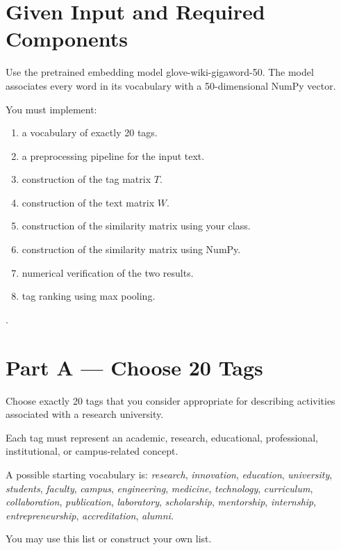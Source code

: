 \documentclass[12pt]{article}
\begin{document}
\section*{Given Input and Required Components}
Use the pretrained embedding model glove-wiki-gigaword-50.
The model associates every word in its vocabulary with a
50-dimensional NumPy vector.

You must implement:
\begin{enumerate}
    \item a vocabulary of exactly 20 tags.
    \item a preprocessing pipeline for the input text.
    \item construction of the tag matrix \(T\).
    \item construction of the text matrix \(W\).
    \item construction of the similarity matrix using your
          {\color{blue}{Vector}} class.
    \item construction of the similarity matrix using NumPy.
    \item numerical verification of the two results.
    \item tag ranking using max pooling.
\end{enumerate}

.

\section*{Part A --- Choose 20 Tags}

Choose exactly 20 tags that you consider appropriate for describing
activities associated with a research university.

Each tag must represent an academic, research, educational,
professional, institutional, or campus-related concept.

A possible starting vocabulary is:
\emph{research},
\emph{innovation},
\emph{education},
\emph{university},
\emph{students},
\emph{faculty},
\emph{campus},
\emph{engineering},
\emph{medicine},
\emph{technology},
\emph{curriculum},
\emph{collaboration},
\emph{publication},
\emph{laboratory},
\emph{scholarship},
\emph{mentorship},
\emph{internship},
\emph{entrepreneurship},
\emph{accreditation},
\emph{alumni}.

You may use this list or construct your own list.
\end{document}
